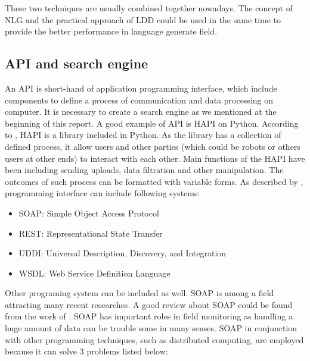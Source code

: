 These two techniques are usually combined together nowadays. 
The concept of NLG and the practical approach of LDD could be used in the same time to provide the better performance in language generate field.
\subsection{API and search engine}
An API is short-hand of  application programming interface, which include components to define a process of communication and data processing on computer. 
It is necessary to create a search engine as we mentioned at the beginning of this report.
A good example of API is HAPI on Python. 
According to \cite{Kochanov201615}, HAPI is a library included in Python. 
As the library has a collection of defined process, it allow users and other parties (which could be robots or others users at other ends) to interact with each other.
Main functions of the HAPI have been including sending uploads, data filtration and other manipulation. 
The outcomes of such process can be formatted with variable forms. 
As described by \cite{Hedbrant20162206}, programming interface can include following systems:
\begin{itemize}
	\item SOAP: Simple Object Access Protocol
	\item REST: Representational State Transfer
	\item UDDI: Universal Description, Discovery, and Integration
	\item WSDL: Web Service Definition Language
\end{itemize}
	Other programing system can be included as well. 
	SOAP is among a field attracting many recent researches. 
	A good review about SOAP could be found from the work of \cite{Hsieh2009424}. 
	SOAP has important roles in field monitoring as handling a huge amount of data can be trouble some in many senses. 
	SOAP in conjunction with other programming techniques, such as distributed computing, are employed because it can solve 3 problems listed below:
